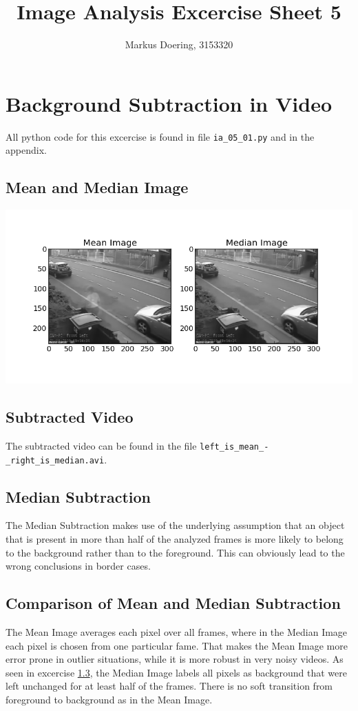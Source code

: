 \documentclass[11pt,a4paper]{scrartcl}
\begin{document}
\title{Image Analysis Excercise Sheet 5}
\author{Markus Doering, 3153320}
\maketitle

\section{Background Subtraction in Video}
All python code for this excercise is found in file \verb$ia_05_01.py$ and in the appendix.
\subsection{Mean and Median Image}
\includegraphics[width=.99\linewidth]{mean_and_median_image_cut.png}

\subsection{Subtracted Video}
The subtracted video can be found in the file \verb$left_is_mean_-_right_is_median.avi$.

\subsection{Median Subtraction}\label{median}
The Median Subtraction makes use of the underlying assumption that an object that is present in more than half of the analyzed frames is more likely to belong to the background rather than to the foreground. 
This can obviously lead to the wrong conclusions in border cases.

\subsection{Comparison of Mean and Median Subtraction}
The Mean Image averages each pixel over all frames, where in the Median Image each pixel is chosen from one particular fame. That makes the Mean Image more error prone in outlier situations, while 
it is more robust in very noisy videos. As seen in excercise \ref{median}, the Median Image labels all pixels as background that were left unchanged for at least half of the frames. There is no 
soft transition from foreground to background as in the Mean Image. 
\end{document}
